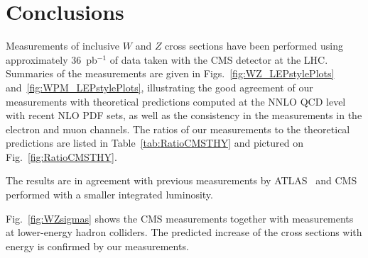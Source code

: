 \section{Conclusions\label{sec:conclusions}}

Measurements of inclusive $W$ and $Z$ cross sections have been
performed using approximately 36~pb$^{-1}$ of data taken with the 
CMS detector at the LHC. 
Summaries of the measurements are given 
in Figs.~\ref{fig:WZ_LEPstylePlots} and~\ref{fig:WPM_LEPstylePlots},
illustrating the good agreement of our measurements with theoretical
predictions computed at the NNLO QCD level with recent NLO PDF sets,
as well as the consistency in the measurements in the electron
and muon channels.  The ratios of our measurements to the theoretical
predictions are listed in Table~\ref{tab:RatioCMSTHY}
and pictured on Fig.~\ref{fig:RatioCMSTHY}.  

The results are in agreement with previous measurements
by ATLAS~\cite{WZATLAS:2010} and
CMS~\cite{WZCMS:2010} performed with a smaller integrated luminosity.
%
%

\par
Fig.~\ref{fig:WZsigmas} shows the CMS measurements together 
with measurements at lower-energy hadron colliders.
The predicted increase of the cross sections with energy is confirmed
by our measurements.

